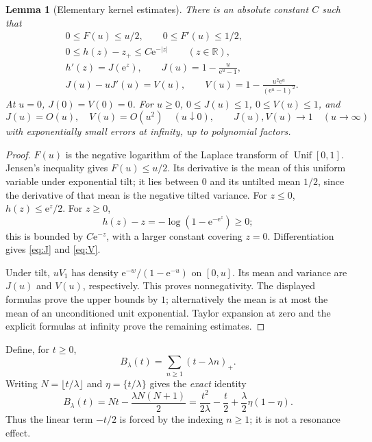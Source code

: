 \documentclass[11pt,a4paper]{article}
\newtheorem{lemma}[theorem]{Lemma}
\theoremstyle{definition}
\theoremstyle{remark}\newtheorem{remark}[theorem]{Remark}
\newcommand{\R}{\mathbb R}
\newcommand{\Unif}{\operatorname{Unif}}
\newcommand{\e}{\mathrm e}
\begin{document}
\begin{lemma}[Elementary kernel estimates]
\label{lem:kernel}
There is an absolute constant $C$ such that
\begin{align}
 &0\le F(u)\le u/2,\qquad 0\le F'(u)\le1/2,\label{eq:Fbounds}\\
 &0\le h(z)-z_+\le C\e^{-|z|}\qquad(z\in\R),\label{eq:hcut}\\
 &h'(z)=J(\e^z),\qquad
 J(u)=1-\frac{u}{\e^u-1},\label{eq:J}\\
 &J(u)-uJ'(u)=V(u),\qquad
 V(u)=1-\frac{u^2\e^u}{(\e^u-1)^2}.
 \label{eq:V}
\end{align}
At $u=0$, $J(0)=V(0)=0$.  For $u\ge0$,
$0\le J(u)\le1$, $0\le V(u)\le1$, and
\[
 J(u)=O(u),\quad V(u)=O(u^2)\quad(u\downarrow0),
 \qquad J(u),V(u)\longrightarrow1\quad(u\to\infty)
\]
with exponentially small errors at infinity, up to polynomial factors.
\end{lemma}
\begin{proof}
$F(u)$ is the negative logarithm of the Laplace transform of $\Unif[0,1]$.
Jensen's inequality gives $F(u)\le u/2$.  Its derivative is the mean of this
uniform variable under exponential tilt; it lies between $0$ and its untilted
mean $1/2$, since the derivative of that mean is the negative tilted variance.
For $z\le0$, $h(z)\le\e^z/2$.  For $z\ge0$,
\[
 h(z)-z=-\log(1-\e^{-\e^z})\ge0;
\]
this is bounded by $C\e^{-z}$, with a larger constant covering $z=0$.
Differentiation gives \eqref{eq:J} and \eqref{eq:V}.

Under tilt, $uV_1$ has density
$\e^{-w}/(1-\e^{-u})$ on $[0,u]$.  Its mean and variance are $J(u)$ and
$V(u)$, respectively.  This proves nonnegativity.  The displayed formulas
prove the upper bounds by $1$; alternatively the mean is at most the mean of
an unconditioned unit exponential.  Taylor expansion at zero and the explicit
formulas at infinity prove the remaining estimates.
\end{proof}

Define, for $t\ge0$,
\begin{equation}
 B_\lambda(t)=\sum_{n\ge1}(t-\lambda n)_+.
 \label{eq:Bdef}
\end{equation}
Writing $N=\lfloor t/\lambda\rfloor$ and $\eta=\{t/\lambda\}$ gives the
\emph{exact} identity
\begin{equation}
 B_\lambda(t)=Nt-\frac{\lambda N(N+1)}2
 =\frac{t^2}{2\lambda}-\frac t2+
       \frac\lambda2\eta(1-\eta).
 \label{eq:Bexact}
\end{equation}
Thus the linear term $-t/2$ is forced by the indexing $n\ge1$; it is not a
resonance effect.
\end{document}
